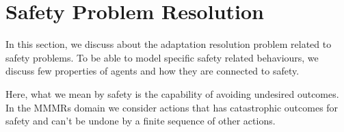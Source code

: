 \documentclass[journal]{IEEEtran}
\theoremstyle{definition}
\newcommand\patrizio[1]{\nb{Patrizio}{#1}}
\begin{document}








\section{Safety Problem Resolution} 

In this section, we discuss about the adaptation resolution problem related to safety problems. To be able to model specific safety related behaviours, we discuss few properties of agents and how they are connected to safety. %







Here, what we mean by safety is the capability of avoiding undesired outcomes. In the MMMRs domain we consider actions that has catastrophic outcomes for safety and can't be undone by a finite sequence of other actions. 
\end{document}
